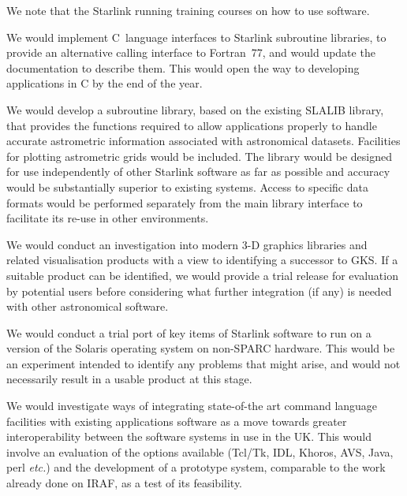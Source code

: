 {We note that the  Starlink running training courses on how to
use software.}

{We would implement C~language interfaces to Starlink subroutine
libraries, to provide an alternative calling interface to Fortran~77,
and would update the documentation to describe them. This would open
the way to developing applications in C by the end of the year.}

{We would develop a subroutine library, based on the existing SLALIB
library, that provides the functions required to allow applications
properly to handle accurate astrometric information associated with
astronomical datasets. Facilities for plotting astrometric grids would
be included. The library would be designed for use independently of
other Starlink software as far as possible and accuracy would be
substantially superior to existing systems. Access to specific data
formats would be performed separately from the main library interface
to facilitate its re-use in other environments.}

{We would conduct an investigation into modern 3-D graphics libraries
and related visualisation products with a view to identifying a
successor to GKS. If a suitable product can be identified, we would
provide a trial release for evaluation by potential users before
considering what further integration (if any) is needed with other
astronomical software.}

{We would conduct a trial port of key items of Starlink software to
run on a version of the Solaris operating system on non-SPARC
hardware. This would be an experiment intended to identify any
problems that might arise, and would not necessarily result in a
usable product at this stage.}

{We would investigate ways of integrating state-of-the art command
language facilities with existing applications software as a move
towards greater interoperability between the software systems in use
in the UK. This would involve an evaluation of the options available
(Tcl/Tk, IDL, Khoros, AVS, Java, perl {\em etc.}) and the development
of a prototype system, comparable to the work already done on IRAF, as
a test of its feasibility.}

